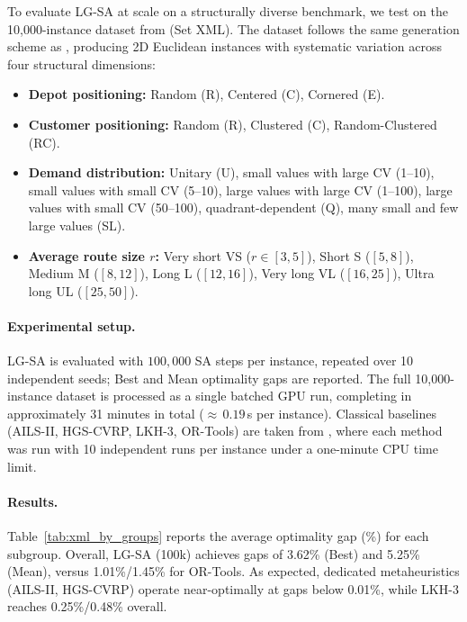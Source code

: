 \documentclass[letterpaper]{article} %
\begin{document}
To evaluate LG-SA at scale on a structurally diverse benchmark, we test on the 10,000-instance dataset from \citet{queiroga_10000_nodate} (Set XML). The dataset follows the same generation scheme as \citet{uchoa_new_2017}, producing 2D Euclidean instances with systematic variation across four structural dimensions:
\begin{itemize}
    \item \textbf{Depot positioning:} Random (R), Centered (C), Cornered (E).
    \item \textbf{Customer positioning:} Random (R), Clustered (C), Random-Clustered (RC).
    \item \textbf{Demand distribution:} Unitary (U), small values with large CV (1--10), small values with small CV (5--10), large values with large CV (1--100), large values with small CV (50--100), quadrant-dependent (Q), many small and few large values (SL).
    \item \textbf{Average route size $r$:} Very short VS ($r \in [3,5]$), Short S ($[5,8]$), Medium M ($[8,12]$), Long L ($[12,16]$), Very long VL ($[16,25]$), Ultra long UL ($[25,50]$).
\end{itemize}

\paragraph{Experimental setup.}
LG-SA is evaluated with $100{,}000$ SA steps per instance, repeated over 10 independent seeds; Best and Mean optimality gaps are reported. The full 10,000-instance dataset is processed as a single batched GPU run, completing in approximately 31 minutes in total ($\approx$\,$0.19$\,s per instance). Classical baselines (AILS-II, HGS-CVRP, LKH-3, OR-Tools) are taken from \citet{queiroga_10000_nodate}, where each method was run with 10 independent runs per instance under a one-minute CPU time limit.

\paragraph{Results.}
Table~\ref{tab:xml_by_groups} reports the average optimality gap (\%) for each subgroup. Overall, LG-SA (100k) achieves gaps of 3.62\% (Best) and 5.25\% (Mean), versus 1.01\%/1.45\% for OR-Tools. As expected, dedicated metaheuristics (AILS-II, HGS-CVRP) operate near-optimally at gaps below 0.01\%, while LKH-3 reaches 0.25\%/0.48\% overall.
\end{document}
